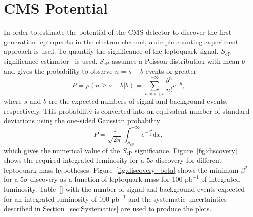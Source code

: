 %

\section{CMS Potential} \label{CMSpotential}

In order to estimate the potential of the CMS detector to discover the first generation leptoquarks
in the electron channel, a simple counting experiment approach is used. To quantify the significance of the
leptoquark signal, $S_\text{cP}$ significance estimator~\cite{ref:scp} is used. $S_\text{cP}$ assumes a Poisson distribution
with mean $b$ and gives the probability to observe $n=s+b$ events or greater
\begin{equation}
P = p(n\geq s+b|b) = \sum_{n=s+b}^{+\infty} \frac{b^n}{n!}e^{-b},
\end{equation}
where $s$ and $b$ are the expected numbers of signal and background events, respectively. This probability is 
converted into an equivalent number of standard deviations using the one-sided Gaussian probability
\begin{equation}
P = \frac{1}{\sqrt{2\pi}}\int_{S_\text{cP}}^{+\infty} e^{-\frac{x^2}{2}}\mathrm{d}x,
\end{equation}
which gives the numerical value of the $S_\text{cP}$ significance. Figure~\ref{fig:discovery} shows the required integrated luminosity
for a $5\sigma$ discovery for different leptoquark mass hypotheses. Figure~\ref{fig:discovery_beta} shows the minimum $\beta^2$ for
a $5\sigma$ discovery as a function of leptoquark mass for $100\text{ pb}^{-1}$ of integrated luminosity.
Table~\ref{} with the number of signal and background events expected for an integrated luminosity
of $100\text{ pb}^{-1}$ and the systematic uncertainties described in Section~\ref{sec:Systematics} are used to produce the plots.

